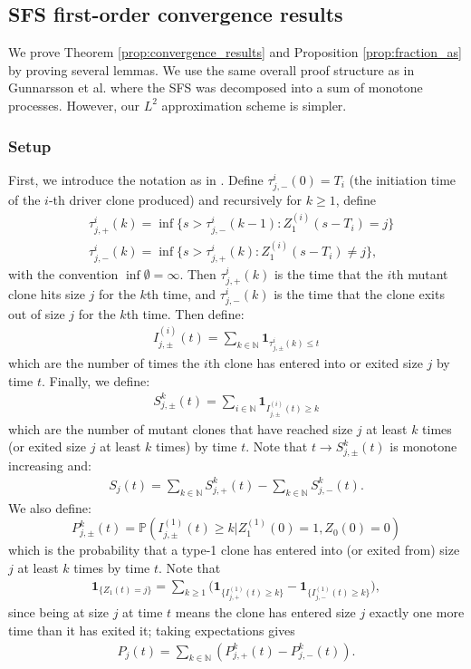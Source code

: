 \documentclass{article}
\numberwithin{equation}{section}
\begin{document}
\subsection{SFS first-order convergence results}\label{app:SFS_convergence}

We prove Theorem \ref{prop:convergence_results} and Proposition \ref{prop:fraction_as} by proving several lemmas. We use the same overall proof structure as in Gunnarsson et al. \cite{gunnarsson2025} where the SFS was decomposed into a sum of monotone processes. However, our $L^2$ approximation scheme is simpler.
\subsubsection{Setup}
First, we introduce the notation as in \cite{gunnarsson2025}. Define $\tau_{j,-}^i(0)=T_i$ (the initiation time of the $i$-th driver clone produced) and recursively for $k\geq 1$, define
\begin{align*}
  &\tau_{j,+}^i(k)=\inf\{s>\tau_{j,-}^i(k-1):Z_1^{(i)}(s-T_i)=j\}\\
  &\tau_{j,-}^i(k)=\inf\{s>\tau_{j,+}^i(k):Z_1^{(i)}(s-T_i)\neq j\},
\end{align*}
with the convention $\inf\emptyset=\infty$. Then $\tau_{j,+}^i(k)$ is the time that the $i$th mutant clone hits size $j$ for the $k$th time, and $\tau_{j,-}^i(k)$ is the time that the clone exits out of size $j$ for the $k$th time. Then define:
\begin{align*}
  I_{j,\pm}^{(i)}(t)=\sum_{k\in \mathbb{N}}\mathbf{1}_{\tau_{j,\pm}^i(k)\leq t}
\end{align*}
which are the number of times the $i$th clone has entered into or exited size $j$ by time $t$. Finally, we define:
\begin{align}
  S_{j,\pm}^{k}(t)=\sum_{i\in\mathbb{N}} \mathbf{1}_{I^{(i)}_{j,\pm}(t)\geq k}\label{eq:def_S_j_pm}
\end{align}
which are the number of mutant clones that have reached size $j$ at least $k$ times (or exited size $j$ at least $k$ times) by time $t$. Note that $t\to S_{j,\pm}^{k}(t)$ is monotone increasing and:
\begin{align}
  S_j(t)=\sum_{k\in \mathbb{N}} S_{j,+}^{k}(t)-\sum_{k\in \mathbb{N}} S_{j,-}^{k}(t).\label{eq:S_j_decomposition}
\end{align}
We also define:
\[P^k_{j,\pm}(t)=\mathbb{P}\left(I_{j,\pm}^{(1)}(t)\geq k|Z_1^{(1)}(0)=1,Z_0(0)=0\right)\]
which is the probability that a type-1 clone has entered into (or exited from) size $j$ at least $k$ times by time $t$. Note that
\begin{align*}
\mathbf{1}_{\{Z_1(t)=j\}}
= \sum_{k\ge1}\big(\mathbf{1}_{\{I^{(1)}_{j,+}(t)\ge k\}}
-
\mathbf{1}_{\{I^{(1)}_{j,-}(t)\ge k\}}\big),
\end{align*}
since being at size $j$ at time $t$ means the clone has entered size $j$ exactly one more time than it has exited it; taking expectations gives 
\begin{align}
    P_{j}(t)=\sum_{k\in \mathbb{N}}\left(P_{j,+}^k(t)-P_{j,-}^k(t)\right).\label{eq:P_j_decomposition}
\end{align}
\end{document}
